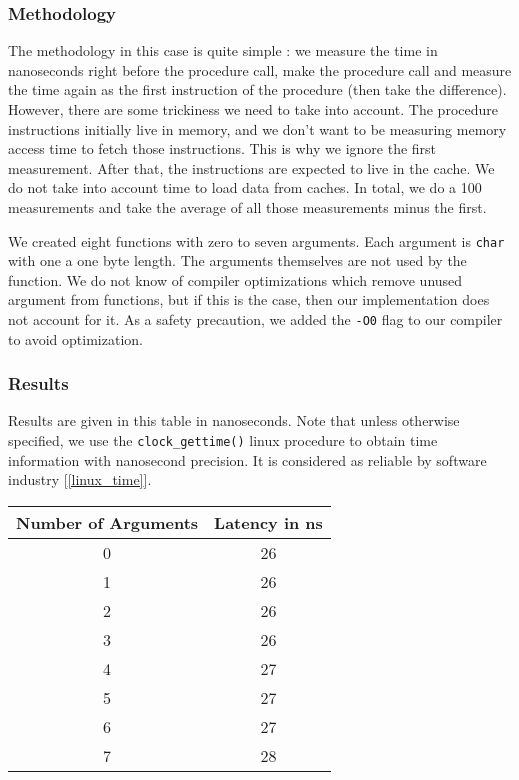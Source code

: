\subsubsection{Methodology}

The methodology in this case is quite simple : we measure the time in nanoseconds
right before the procedure call, make the procedure call and measure the time again
as the first instruction of the procedure (then take the difference). However, there are some trickiness we need to take
into account. The procedure instructions initially live in memory, and we don't want to be
measuring memory access time to fetch those instructions. This is why we ignore the 
first measurement. After that, the instructions are expected to live in the cache. We do
not take into account time to load data from caches. In total, we do a 100 measurements
and take the average of all those measurements minus the first.

We created eight functions with zero to seven arguments. Each argument is \texttt{char} with one
a one byte length. The arguments themselves are not used
by the function. We do not know of compiler optimizations which remove unused argument from
functions, but if this is the case, then our implementation does not account for it. As a safety 
precaution, we added the \texttt{-O0} flag to our compiler to avoid optimization.

\subsubsection{Results}

Results are given in this table in nanoseconds. Note that unless otherwise specified, we
use the \texttt{clock\_gettime()} linux procedure to obtain time information with nanosecond
precision. It is considered as reliable by software industry [\ref{linux_time}].

\begin{center}
\begin{tabular}{| c | c | }
\hline 
Number of Arguments & Latency in ns \\
\hline
0 & 26 \\
1 & 26 \\
2 & 26 \\
3 & 26 \\
4 & 27 \\
5 & 27 \\
6 & 27 \\
7 & 28 \\
\hline
\end{tabular}
\end{center}

